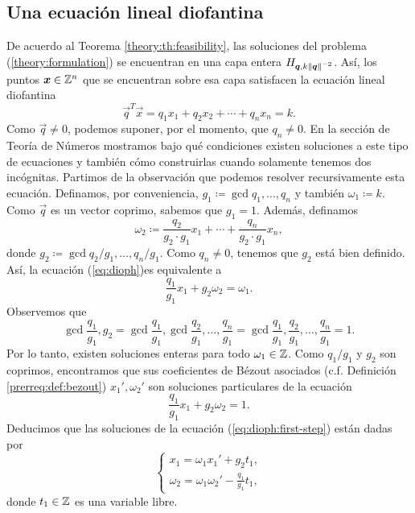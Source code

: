 \subsection{Una ecuación lineal diofantina}
\noindent
De acuerdo al Teorema \ref{theory:th:feasibility}, las soluciones del problema
(\ref{theory:formulation}) se encuentran en una capa entera $H_{\boldsymbol{q}, k\left\lVert \boldsymbol{q} \right\rVert^{-2}}$.
Así, los puntos $\boldsymbol{x} \in \mathbb{Z}^n$ que se encuentran sobre esa capa satisfacen la ecuación lineal
diofantina
\begin{equation}
	\label{eq:dioph}
	\vec{q}^T\vec{x} = q_1x_1 + q_2x_2 + \cdots + q_nx_n = k.
\end{equation}
Como $\vec{q} \neq 0$, podemos suponer, por el momento, que $q_n \neq 0$. En la sección de
Teoría de Números mostramos bajo qué condiciones existen soluciones a este tipo de ecuaciones y
también cómo construirlas cuando solamente tenemos dos incógnitas. Partimos de la observación que
podemos resolver recursivamente esta ecuación. Definamos, por conveniencia, $g_1 \coloneq
\gcd{q_1, \ldots, q_n}$ y también $\omega_1 \coloneq k$. Como $\vec{q}$ es un vector
coprimo, sabemos que $g_1 = 1$. Además, definamos
\begin{equation*}
	\omega_2 \coloneq \frac{q_2}{g_2 \cdot g_1}x_1 + \cdots + \frac{q_n}{g_2 \cdot
	g_1}x_n,
\end{equation*}
donde $g_2 \coloneq \gcd{q_2/g_1, \ldots, q_n/g_1}$. Como $q_n \neq 0$, tenemos
que $g_2$ está bien definido. Así, la ecuación (\ref{eq:dioph})es equivalente a
\begin{equation}
	\label{eq:dioph:first-step}
	\frac{q_1}{g_1}x_1 + g_2\omega_2 = \omega_1.
\end{equation}
Observemos que
\begin{equation*}
	\gcd{\frac{q_1}{g_1}, g_2}
	= \gcd{\frac{q_1}{g_1}, \gcd{\frac{q_2}{g_1}, \ldots, \frac{q_n}{g_1}}}
	= \gcd{\frac{q_1}{g_1}, \frac{q_2}{g_1}, \ldots, \frac{q_n}{g_1}} = 1.
\end{equation*}
Por lo tanto, existen soluciones enteras para todo $\omega_1 \in \mathbb{Z}$. Como $q_1/g_1$ y $g_2$
son coprimos, encontramos que sus coeficientes de Bézout asociados (c.f. Definición
\ref{prerreq:def:bezout}) $x_1', \omega_2'$ son soluciones particulares de la ecuación
\begin{equation*}
	\frac{q_1}{g_1}x_1 + g_2\omega_2 = 1.
\end{equation*}
Deducimos que las soluciones de la ecuación (\ref{eq:dioph:first-step}) están dadas por
\begin{equation*}
	\begin{cases}
		x_1 = \omega_1x_1' + g_2t_1, \\
		\omega_2 = \omega_1\omega_2' - \frac{q_1}{g_1}t_1,
	\end{cases}
\end{equation*}
donde $t_1 \in \mathbb{Z}$ es una variable libre.

